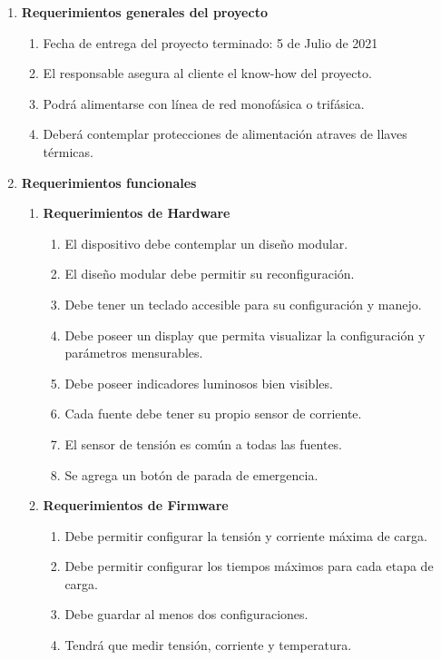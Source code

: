 \documentclass[11pt]{charter}
\begin{document}
\begin{enumerate}
	\item \textbf{Requerimientos generales del proyecto}
	\begin{enumerate}[label*=\arabic*.]
		\item Fecha de entrega del proyecto terminado: 5 de Julio de 2021
		\item El responsable asegura al cliente el know-how del proyecto.
		\item Podrá alimentarse con línea de red monofásica o trifásica.
		\item Deberá contemplar protecciones de alimentación atraves de llaves térmicas. 
	\end{enumerate}

	\item \textbf{Requerimientos funcionales}
	\begin{enumerate}[label*=\arabic*.]
		\item \textbf{Requerimientos de Hardware}
			\begin{enumerate}[label*=\arabic*.]
				\item El dispositivo debe contemplar un diseño modular.
				\item El diseño modular debe permitir su reconfiguración.
				\item Debe tener un teclado accesible para su configuración y manejo.
				\item Debe poseer un display que permita visualizar la configuración y parámetros mensurables.
				\item Debe poseer indicadores luminosos bien visibles.					
				\item Cada fuente debe tener su propio sensor de corriente.
				\item El sensor de tensión es común a todas las fuentes.
				\item Se agrega un botón de parada de emergencia.			
			\end{enumerate}
		\item \textbf{Requerimientos de Firmware}
			\begin{enumerate}[label*=\arabic*.]
				\item Debe permitir configurar la tensión y corriente máxima de carga.
				\item Debe permitir configurar los tiempos máximos para cada etapa de carga.
				\item Debe guardar al menos dos configuraciones.
				\item Tendrá que medir tensión, corriente y temperatura.

\end{enumerate}
\end{enumerate}
\end{enumerate}
\end{document}
